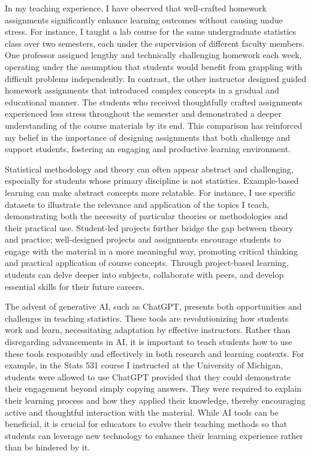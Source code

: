 \documentclass{article}
\begin{document}
In my teaching experience, I have observed that well-crafted homework assignments significantly enhance learning outcomes without causing undue stress.
For instance, I taught a lab course for the same undergraduate statistics class over two semesters, each under the supervision of different faculty members.
One professor assigned lengthy and technically challenging homework each week, operating under the assumption that students would benefit from grappling with difficult problems independently.
In contrast, the other instructor designed guided homework assignments that introduced complex concepts in a gradual and educational manner.
The students who received thoughtfully crafted assignments experienced less stress throughout the semester and demonstrated a deeper understanding of the course materials by its end.
This comparison has reinforced my belief in the importance of designing assignments that both challenge and support students, fostering an engaging and productive learning environment.

Statistical methodology and theory can often appear abstract and challenging, especially for students whose primary discipline is not statistics.
Example-based learning can make abstract concepts more relatable.
For instance, I use specific datasets to illustrate the relevance and application of the topics I teach, demonstrating both the necessity of particular theories or methodologies and their practical use.
Student-led projects further bridge the gap between theory and practice; well-designed projects and assignments encourage students to engage with the material in a more meaningful way, promoting critical thinking and practical application of course concepts.
Through project-based learning, students can delve deeper into subjects, collaborate with peers, and develop essential skills for their future careers.

The advent of generative AI, such as ChatGPT, presents both opportunities and challenges in teaching statistics.
These tools are revolutionizing how students work and learn, necessitating adaptation by effective instructors.
Rather than disregarding advancements in AI, it is important to teach students how to use these tools responsibly and effectively in both research and learning contexts.
For example, in the Stats 531 course I instructed at the University of Michigan, students were allowed to use ChatGPT provided that they could demonstrate their engagement beyond simply copying answers.
They were required to explain their learning process and how they applied their knowledge, thereby encouraging active and thoughtful interaction with the material.
While AI tools can be beneficial, it is crucial for educators to evolve their teaching methods so that students can leverage new technology to enhance their learning experience rather than be hindered by it.
\end{document}
